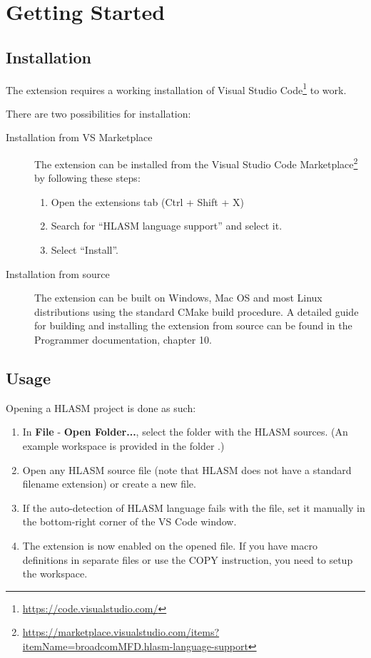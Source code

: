 \section{Getting Started}
\label{sec:start}

\subsection{Installation}

The extension requires a working installation of Visual Studio Code\footnote{\url{https://code.visualstudio.com/}} to work.

There are two possibilities for installation:
\begin{description}
	\item[Installation from VS Marketplace]
	The extension can be installed from the Visual Studio Code Marketplace\footnote{\url{https://marketplace.visualstudio.com/items?itemName=broadcomMFD.hlasm-language-support}} by following these steps:
	\begin{enumerate}
		\item Open the extensions tab (Ctrl + Shift + X)
		\item Search for ``HLASM language support'' and select it.
		\item Select ``Install''.
	\end{enumerate}
	\item[Installation from source]
	The extension can be built on Windows, Mac OS and most Linux distributions using the standard CMake build procedure. A detailed guide for building and installing the extension from source can be found in the Programmer documentation, chapter 10.
\end{description}

\subsection{Usage}

Opening a HLASM project is done as such:

\begin{enumerate}
	\item In \textbf{File} - \textbf{Open Folder...}, select the folder with the HLASM sources.
		(An example workspace is provided in the folder .)
	\item Open any HLASM source file (note that HLASM does not have a standard filename extension) or create a new file.
	\item If the auto-detection of HLASM language fails with the file, set it manually in the bottom-right corner of the VS Code window.  
	\item The extension is now enabled on the opened file. If you have macro definitions in separate files or use the COPY instruction, you need to setup the workspace.
\end{enumerate}

